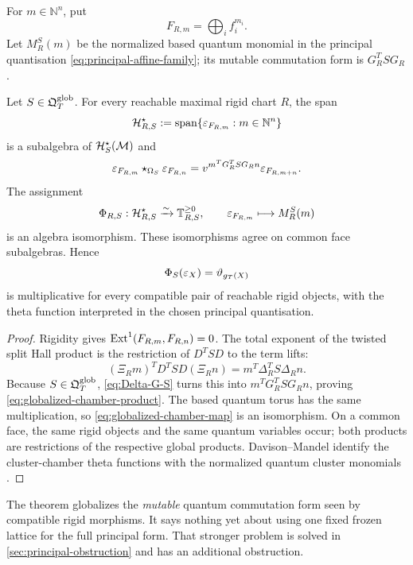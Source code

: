 For $m\in\mathbb N^n$, put
\[
 F_{R,m}=\bigoplus_i f_i^{m_i}.
\]
Let $M_R^S(m)$ be the normalized based quantum monomial in the principal
quantisation \cref{eq:principal-affine-family}; its mutable commutation form is
$G_R^TSG_R$.

\begin{theorem}
\label{thm:globalizable-Hall-theta}
Let $S\in\mathfrak Q^{\mathrm{glob}}_T$.  For every reachable maximal rigid chart $R$, the span
\[
 \mathcal H_{R,S}^\star
 :=\operatorname{span}\{\varepsilon_{F_{R,m}}:m\in\mathbb N^n\}
\]
is a subalgebra of $\mathcal H_S^\star(\mathcal M)$ and
\begin{equation}
 \varepsilon_{F_{R,m}}\star_{\Omega_S}\varepsilon_{F_{R,n}}
 =v^{m^TG_R^TSG_Rn}\varepsilon_{F_{R,m+n}}.
 \label{eq:globalized-chamber-product}
\end{equation}
The assignment
\begin{equation}
 \Phi_{R,S}:\mathcal H_{R,S}^\star\xrightarrow{\sim}\mathbb T_{R,S}^{\ge0},
 \qquad
 \varepsilon_{F_{R,m}}\longmapsto M_R^S(m)
 \label{eq:globalized-chamber-map}
\end{equation}
is an algebra isomorphism.  These isomorphisms agree on common face
subalgebras.  Hence
\[
 \Phi_S(\varepsilon_X)=\vartheta_{g_T(X)}
\]
is multiplicative for every compatible pair of reachable rigid objects,
with the theta function interpreted in the chosen principal quantisation.
\end{theorem}

\begin{proof}
Rigidity gives
$\operatorname{Ext}^1(F_{R,m},F_{R,n})=0$.  The total exponent of the twisted split Hall
product is the restriction of $D^TSD$ to the term lifts:
\[
 (\Xi_Rm)^TD^TSD(\Xi_Rn)
 =m^T\Delta_R^TS\Delta_Rn.
\]
Because $S\in\mathfrak Q^{\mathrm{glob}}_T$, \cref{eq:Delta-G-S} turns this into
$m^TG_R^TSG_Rn$, proving \cref{eq:globalized-chamber-product}.  The based
quantum torus has the same multiplication, so
\cref{eq:globalized-chamber-map} is an isomorphism.  On a common face, the
same rigid objects and the same quantum variables occur; both products are
restrictions of the respective global products.  Davison--Mandel identify the
cluster-chamber theta functions with the normalized quantum cluster monomials
\cite{DavisonMandel}.
\end{proof}

\begin{remark}
The theorem globalizes the \emph{mutable} quantum commutation form seen by
compatible rigid morphisms.  It says nothing yet about using one fixed frozen
lattice for the full principal form.  That stronger problem is solved in
\cref{sec:principal-obstruction} and has an additional obstruction.
\end{remark}
